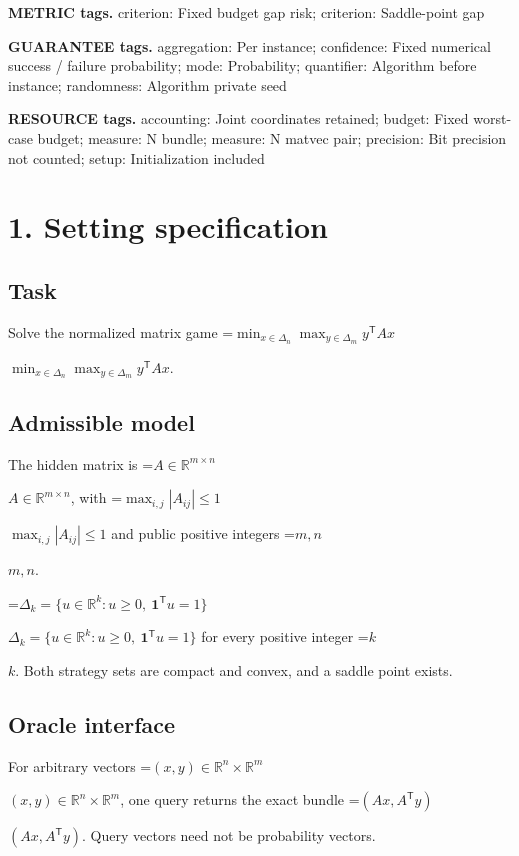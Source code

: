 \documentclass[10pt,a4paper]{article}
\newcommand{\AtlasMath}[1]{\par\begingroup\centering\setbox0=\hbox{$\displaystyle #1$}\ifdim\wd0>1.4\linewidth\typeout{ATLAS WIDE FORMULA: \the\wd0}\fi\ifdim\wd0>\linewidth\resizebox{\linewidth}{!}{\box0}\else\box0\fi\par\endgroup}
\newcommand{\AtlasInlineMath}[1]{\begingroup\setbox0=\hbox{$#1$}\ifdim\wd0>.4\linewidth\endgroup\AtlasMath{#1}\else\endgroup$#1$\fi}
\begin{document}
\textbf{METRIC tags.} criterion: Fixed budget gap risk; criterion: Saddle-point gap



\textbf{GUARANTEE tags.} aggregation: Per instance; confidence: Fixed numerical success / failure probability; mode: Probability; quantifier: Algorithm before instance; randomness: Algorithm private seed



\textbf{RESOURCE tags.} accounting: Joint coordinates retained; budget: Fixed worst-case budget; measure: N bundle; measure: N matvec pair; precision: Bit precision not counted; setup: Initialization included



\section{1. Setting specification}


\subsection{Task}


Solve the normalized matrix game \AtlasInlineMath{\min_{x\in\Delta_n}\max_{y\in\Delta_m}y^{\mathsf T}Ax}.



\subsection{Admissible model}


The hidden matrix is \AtlasInlineMath{A\in\mathbb R^{m\times n}}, with \AtlasInlineMath{\max_{i,j}|A_{ij}|\le1} and public positive integers \AtlasInlineMath{m,n}.



\AtlasInlineMath{\Delta_k=\{u\in\mathbb R^k:u\ge0,\ \mathbf1^{\mathsf T}u=1\}} for every positive integer \AtlasInlineMath{k}. Both strategy sets are compact and convex, and a saddle point exists.



\subsection{Oracle interface}


For arbitrary vectors \AtlasInlineMath{(x,y)\in\mathbb R^n\times\mathbb R^m}, one query returns the exact bundle \AtlasInlineMath{(Ax,A^{\mathsf T}y)}. Query vectors need not be probability vectors.
\end{document}
